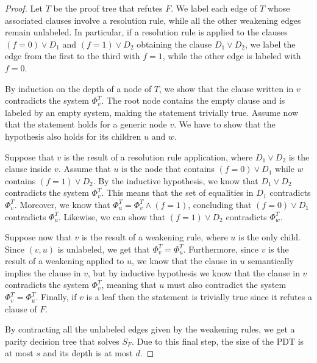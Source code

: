 \begin{proof}
 Let $T$ be the proof tree that refutes $F$. We label each edge of $T$ whose associated clauses involve a resolution rule, while all the other weakening edges remain unlabeled. In particular, if a resolution rule is applied to the clauses $(f = 0) \lor D_1$ and $(f = 1) \lor D_2$ obtaining the clause $D_1 \lor D_2$, we label the edge from the first to the third with $f = 1$, while the other edge is labeled with $f = 0$.

 By induction on the depth of a node of $T$, we show that the clause written in $v$ contradicts the system $\Phi_v^T$. The root node contains the empty clause and is labeled by an empty system, making the statement trivially true. Assume now that the statement holds for a generic node $v$. We have to show that the hypothesis also holds for its children $u$ and $w$.

 Suppose that $v$ is the result of a resolution rule application, where $D_1 \lor D_2$ is the clause inside $v$. Assume that $u$ is the node that contains $(f = 0) \lor D_1$ while $w$ contains $(f = 1) \lor D_2$. By the inductive hypothesis, we know that $D_1 \lor D_2$ contradicts the system $\Phi_v^T$. This means that the set of equalities in $D_1$ contradicts $\Phi_v^T$. Moreover, we know that $\Phi_u^T = \Phi_v^T \land (f = 1)$, concluding that $(f = 0) \lor D_1$ contradicts $\Phi_u^T$. Likewise, we can show that $(f = 1) \lor D_2$ contradicts $\Phi_w^T$.
    
 Suppose now that $v$ is the result of a weakening rule, where $u$ is the only child. Since $(v,u)$ is unlabeled, we get that $\Phi_v^T = \Phi_u^T$. Furthermore, since $v$ is the result of a weakening applied to $u$, we know that the clause in $u$ semantically implies the clause in $v$, but by inductive hypothesis we know that the clause in $v$ contradicts the system $\Phi_v^T$, meaning that $u$ must also contradict the system $\Phi_v^T = \Phi_u^T$. Finally, if $v$ is a leaf then the statement is trivially true since it refutes a clause of $F$.

 By contracting all the unlabeled edges given by the weakening rules, we get a parity decision tree that solves $S_F$. Due to this final step, the size of the PDT is at most $s$ and its depth is at most $d$. 
\end{proof}

